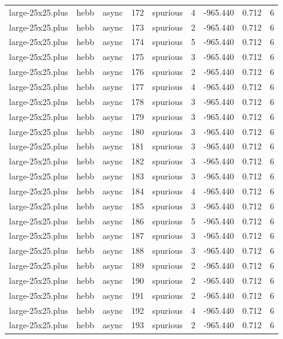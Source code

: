 \begin{tabular}{lllrlrrrr}
large-25x25.plus & hebb & async & 172 & spurious & 4 & -965.440 & 0.712 & 6 \\
large-25x25.plus & hebb & async & 173 & spurious & 2 & -965.440 & 0.712 & 6 \\
large-25x25.plus & hebb & async & 174 & spurious & 5 & -965.440 & 0.712 & 6 \\
large-25x25.plus & hebb & async & 175 & spurious & 3 & -965.440 & 0.712 & 6 \\
large-25x25.plus & hebb & async & 176 & spurious & 2 & -965.440 & 0.712 & 6 \\
large-25x25.plus & hebb & async & 177 & spurious & 4 & -965.440 & 0.712 & 6 \\
large-25x25.plus & hebb & async & 178 & spurious & 3 & -965.440 & 0.712 & 6 \\
large-25x25.plus & hebb & async & 179 & spurious & 3 & -965.440 & 0.712 & 6 \\
large-25x25.plus & hebb & async & 180 & spurious & 3 & -965.440 & 0.712 & 6 \\
large-25x25.plus & hebb & async & 181 & spurious & 3 & -965.440 & 0.712 & 6 \\
large-25x25.plus & hebb & async & 182 & spurious & 3 & -965.440 & 0.712 & 6 \\
large-25x25.plus & hebb & async & 183 & spurious & 3 & -965.440 & 0.712 & 6 \\
large-25x25.plus & hebb & async & 184 & spurious & 4 & -965.440 & 0.712 & 6 \\
large-25x25.plus & hebb & async & 185 & spurious & 3 & -965.440 & 0.712 & 6 \\
large-25x25.plus & hebb & async & 186 & spurious & 5 & -965.440 & 0.712 & 6 \\
large-25x25.plus & hebb & async & 187 & spurious & 3 & -965.440 & 0.712 & 6 \\
large-25x25.plus & hebb & async & 188 & spurious & 3 & -965.440 & 0.712 & 6 \\
large-25x25.plus & hebb & async & 189 & spurious & 2 & -965.440 & 0.712 & 6 \\
large-25x25.plus & hebb & async & 190 & spurious & 2 & -965.440 & 0.712 & 6 \\
large-25x25.plus & hebb & async & 191 & spurious & 2 & -965.440 & 0.712 & 6 \\
large-25x25.plus & hebb & async & 192 & spurious & 4 & -965.440 & 0.712 & 6 \\
large-25x25.plus & hebb & async & 193 & spurious & 2 & -965.440 & 0.712 & 6 \\

\end{tabular}
